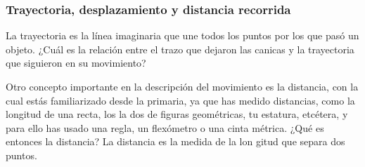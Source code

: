 \documentclass[11pt]{book}
\begin{document}
\subsubsection{Trayectoria, desplazamiento y distancia recorrida}
La
trayectoria es la línea imaginaria que une todos los
puntos por los que pasó un
objeto. ¿Cuál es la relación entre el trazo que dejaron
las canicas y la trayectoria que siguieron en su movimiento?

Otro concepto importante en la descripción del movimiento es
la distancia, con la cual estás familiarizado desde la primaria, ya
que has medido distancias, como la longitud de una recta, los la
dos de figuras geométricas, tu estatura, etcétera, y para ello has
usado una regla, un flexómetro o una cinta métrica.
¿Qué es entonces la distancia? La distancia es la medida de la lon
gitud que separa dos puntos.
\end{document}
